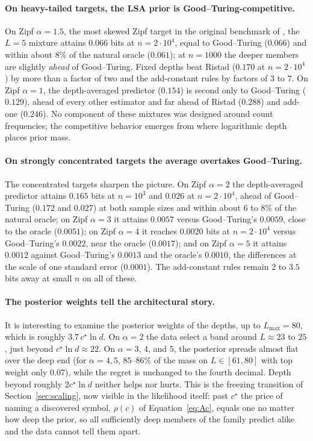 \documentclass[11pt]{article}
\newcommand{\price}{\rho}            %
\begin{document}
\paragraph{On heavy-tailed targets, the LSA prior is
Good--Turing-competitive.}
On Zipf \(\alpha=1.5\), the most skewed Zipf target in the original
benchmark of \cite{orlitsky2015competitive}, the \(L=5\)
mixture attains \(0.066\) bits at \(n=2\cdot10^4\), equal to Good--Turing
(\(0.066\)) and within about \(8\%\) of the natural oracle (\(0.061\));
at \(n=1000\) the deeper members are slightly \emph{ahead} of Good--Turing.
Fixed depths beat Ristad (\(0.170\) at \(n=2\cdot10^4\)) by more than a
factor of two and the add-constant rules by factors of \(3\) to \(7\). On
Zipf \(\alpha=1\), the depth-averaged predictor (\(0.154\)) is second only to
Good--Turing (\(0.129\)), ahead of every other estimator 
and far ahead of Ristad (\(0.288\)) and
add-one (\(0.246\)).  No component of these mixtures was designed around
count frequencies; the competitive behavior emerges from where logarithmic
depth places prior mass.
\paragraph{On strongly concentrated targets the average overtakes
Good--Turing.}
The concentrated targets sharpen the picture.  On Zipf \(\alpha=2\) the
depth-averaged predictor attains \(0.165\) bits at \(n=10^3\) and
\(0.026\) at \(n=2\cdot10^4\), ahead of Good--Turing (\(0.172\) and
\(0.027\)) at both sample sizes and within about \(6\) to \(8\%\) of the natural
oracle; on Zipf \(\alpha=3\) it attains \(0.0057\) versus Good--Turing's
\(0.0059\), close to the oracle (\(0.0051\)); on Zipf \(\alpha=4\)
it reaches \(0.0020\) bits at \(n=2\cdot10^4\) versus Good--Turing's
\(0.0022\), near the oracle (\(0.0017\)); and on Zipf \(\alpha=5\) it
attains \(0.0012\) against Good--Turing's \(0.0013\) and the oracle's
\(0.0010\), the differences at the scale of one standard error
(\(0.0001\)).  The add-constant rules remain \(2\) to \(3.5\)
bits away at small \(n\) on all of these.  
\paragraph{The posterior weights tell the
architectural story.} It is interesting to examine the posterior weights of the depths, up to
\(L_{\max}=80\), which is roughly \(3.7\,c^\star\ln d\).  On \(\alpha=2\) the data
select a band around \(L\approx23\) to \(25\), just beyond
\(c^\star\ln d \approx 22\).  On \(\alpha=3\), \(4\), and \(5\), 
the posterior spreads almost
flat over the deep end (for \(\alpha=4,5\), \(85\)--\(86\%\) of the mass on
\(L\in[61,80]\) with top weight only \(0.07\)), while the regret is
unchanged to the fourth decimal.
Depth beyond roughly \(2c^\star\ln d\) neither helps nor hurts.  This
is the freezing transition of Section~\ref{sec:scaling}, now visible
in the likelihood itself: past \(c^\star\) the price of naming a
discovered symbol, \(\price(c)\) of Equation~\eqref{eq:Ac}, equals one no
matter how deep the prior, so all sufficiently deep members of the
family predict alike and the data cannot tell them apart.
\end{document}
